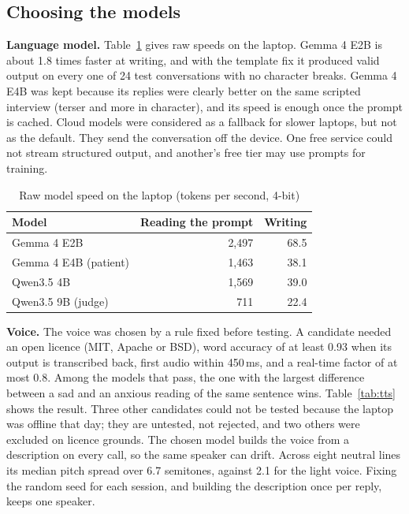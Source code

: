 \documentclass{article}
\begin{document}
\subsection{Choosing the models}
\textbf{Language model.} Table~\ref{tab:bench} gives raw speeds on the laptop. Gemma 4 E2B is about 1.8 times faster at writing, and with the
template fix it produced valid output on every one of 24 test conversations with no character breaks. Gemma 4 E4B was kept because its replies
were clearly better on the same scripted interview (terser and more in character), and its speed is enough once the prompt is cached. Cloud models were considered as a fallback for slower laptops, but not as the default. They send the conversation off the device. One free service could not stream structured output, and another's free tier may use prompts for training.

\begin{table}[t]
\caption{Raw model speed on the laptop (tokens per second, 4-bit)}
\label{tab:bench}
\centering
\footnotesize
\begin{tabular}{@{}lrr@{}}
\toprule
Model & Reading the prompt & Writing\\
\midrule
Gemma 4 E2B & 2,497 & 68.5\\
Gemma 4 E4B (patient) & 1,463 & 38.1\\
Qwen3.5 4B & 1,569 & 39.0\\
Qwen3.5 9B (judge) & 711 & 22.4\\
\bottomrule
\end{tabular}
\end{table}

\textbf{Voice.} The voice was chosen by a rule fixed before testing. A candidate needed an open licence (MIT, Apache or BSD), word accuracy of at least 0.93 when its output is transcribed back, first audio within 450\,ms, and a real-time factor of at most 0.8. Among the models that pass, the one with the largest difference between a sad and an anxious reading of the same sentence wins. Table~\ref{tab:tts} shows the result. Three
other candidates could not be tested because the laptop was offline that day; they are untested, not rejected, and two others were excluded on
licence grounds. The chosen model builds the voice from a description on every call, so the same speaker can drift. Across eight neutral lines its median pitch spread over 6.7 semitones, against 2.1 for the light voice. Fixing the random seed for each session, and building the description
once per reply, keeps one speaker.
\end{document}
